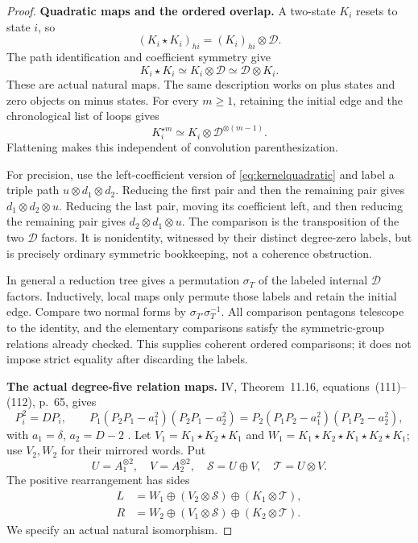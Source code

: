 \documentclass[11pt,a4paper]{article}
\theoremstyle{named}\newtheorem{finding}{Finding}[section]
\theoremstyle{definition}\newtheorem{definition}[finding]{Definition}
\theoremstyle{remark}\newtheorem{remark}[finding]{Remark}
\begin{document}
\begin{proof}
\par\smallskip\noindent\textbf{Quadratic maps and the ordered overlap.}\quad
A two-state $K_i$ resets to state $i$, so
\[
 (K_i\star K_i)_{hi}=(K_i)_{hi}\otimes\mathcal D.
\]
The path identification and coefficient symmetry give
\begin{equation}\label{eq:kernelquadratic}
 K_i\star K_i\simeq K_i\otimes\mathcal D
                   \simeq\mathcal D\otimes K_i.
\end{equation}
These are actual natural maps.
The same description works on plus states and zero
objects on minus states.
For every $m\ge1$, retaining the initial edge and the
chronological list of loops gives
\[
 K_i^{\star m}\simeq
 K_i\otimes\mathcal D^{\otimes(m-1)}.
\]
Flattening makes this independent of convolution
parenthesization.

For precision, use the left-coefficient version of
\eqref{eq:kernelquadratic} and label a triple path
$u\otimes d_1\otimes d_2$.
Reducing the first pair and then the remaining pair
gives $d_1\otimes d_2\otimes u$.
Reducing the last pair, moving its coefficient left,
and then reducing the remaining pair gives
$d_2\otimes d_1\otimes u$.
The comparison is the transposition of the two
$\mathcal D$ factors.
It is nonidentity, witnessed by their distinct
degree-zero labels, but is precisely ordinary
symmetric bookkeeping, not a coherence obstruction.

In general a reduction tree gives a permutation
$\sigma_T$ of the labeled internal $\mathcal D$ factors.
Inductively, local maps only permute those labels and
retain the initial edge.
Compare two normal forms by
$\sigma_{T'}\sigma_T^{-1}$.
All comparison pentagons telescope to the identity,
and the elementary comparisons satisfy the symmetric-group
relations already checked.
This supplies coherent ordered comparisons; it does not
impose strict equality after discarding the labels.

\par\smallskip\noindent\textbf{The actual degree-five relation maps.}\quad
IV, Theorem~11.16, equations~(111)--(112), p.~65, gives
\[
 P_i^2=DP_i,\qquad
 P_1(P_2P_1-a_1^2)(P_2P_1-a_2^2)
 =
 P_2(P_1P_2-a_1^2)(P_1P_2-a_2^2),
\]
with $a_1=\delta$, $a_2=D-2$ \cite{IV}.
Let $V_1=K_1\star K_2\star K_1$ and
$W_1=K_1\star K_2\star K_1\star K_2\star K_1$;
use $V_2,W_2$ for their mirrored words.
Put
\[
 U=A_1^{\otimes2},\quad V=A_2^{\otimes2},\quad
 \mathcal S=U\oplus V,\quad \mathcal T=U\otimes V.
\]
The positive rearrangement has sides
\begin{align}
 L&=W_1\oplus(V_2\otimes\mathcal S)
                         \oplus(K_1\otimes\mathcal T),\nonumber\\
 R&=W_2\oplus(V_1\otimes\mathcal S)
                         \oplus(K_2\otimes\mathcal T).
 \label{eq:kerneldegreefive}
\end{align}
We specify an actual natural isomorphism.


\end{proof}
\end{document}
